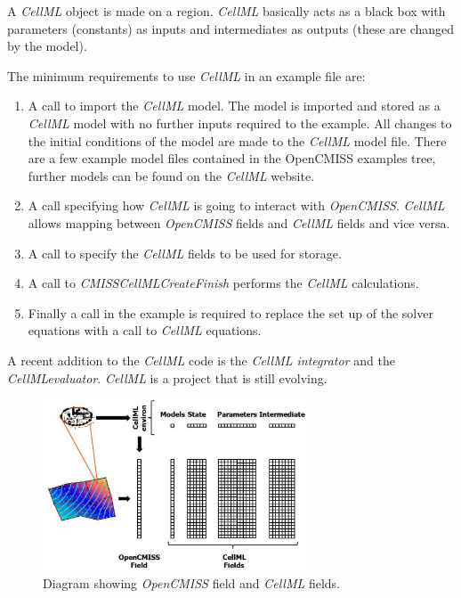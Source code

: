 A \emph{CellML} object is made on a region. \emph{CellML} basically acts as a
black box with parameters (constants) as inputs and intermediates as outputs 
(these are changed by the model). 

The minimum requirements to use \emph{CellML} in an example file are: 

\begin{enumerate}
 \item A call to import the \emph{CellML} model. The model is imported and
stored as a \emph{CellML} model with no further inputs required to the 
example. All changes to the initial conditions of the model are made to 
the \emph{CellML} model file. There are a few example model files contained 
in the OpenCMISS examples tree, further models can be found on the 
\emph{CellML} website.
 \item A call specifying how \emph{CellML} is going to interact with
\emph{OpenCMISS}. \emph{CellML} allows mapping between \emph{OpenCMISS} 
fields and \emph{CellML} fields and vice versa. 
 \item A call to specify the \emph{CellML} fields to be used for storage. 
 \item A call to \emph{CMISSCellMLCreateFinish} performs the \emph{CellML}
calculations.
 \item Finally a call in the example is required to replace the set up of the
solver equations with a call to \emph{CellML} equations.
\end{enumerate}

\noindent A recent addition to the \emph{CellML} code is the \emph{CellML
integrator} and the \emph{CellMLevaluator}. \emph{CellML} is a project 
that is still evolving.

\begin{figure}
\centering
      \includegraphics[width=0.7\textwidth]{figs/Modules/cellml_interface.eps}
\caption{Diagram showing \emph{OpenCMISS} field and \emph{CellML} fields.}
\label{cellml_interface}
\end{figure}


